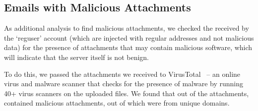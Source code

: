 \subsection{Emails with Malicious Attachments}
As additional analysis to find malicious attachments, we checked the \emails received by the `reguser' account (which are injected with regular \email addresses and not malicious data) for the presence of attachments that may contain malicious software, which will indicate that the server itself is not benign. 

To do this, we passed the \totalattachmentcount attachments we received to VirusTotal~\cite{virustotal} -- an online virus and malware scanner that checks for the presence of malware by running 40+ virus scanners on the uploaded files. We found that out of the \totalattachmentcount attachments, \totalvirusemails \emails contained malicious attachments, out of which \totalvirusattachmentcount were from unique domains. 
